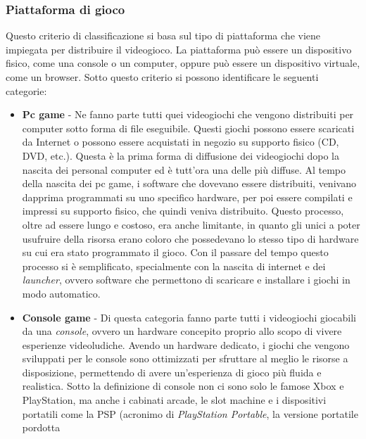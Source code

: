        \subsubsection{Piattaforma di gioco}
            Questo criterio di classificazione si basa sul tipo di piattaforma che viene impiegata per distribuire il videogioco. La piattaforma può essere un dispositivo fisico, come
            una console o un computer, oppure può essere un dispositivo virtuale, come un browser. Sotto questo criterio si possono identificare le seguenti categorie:
            \begin{itemize}
                \item \textbf{Pc game} - Ne fanno parte tutti quei videogiochi che vengono distribuiti per computer sotto forma di file eseguibile. Questi giochi possono essere
                    scaricati da Internet o possono essere acquistati in negozio su supporto fisico (CD, DVD, etc.). Questa è la prima forma di diffusione dei videogiochi dopo la
                    nascita dei personal computer ed è tutt'ora una delle più diffuse. Al tempo della nascita dei pc game, i software che dovevano essere distribuiti, venivano dapprima
                    programmati su uno specifico hardware, per poi essere compilati e impressi su supporto fisico, che quindi veniva distribuito. Questo processo, oltre ad essere
                    lungo e costoso, era anche limitante, in quanto gli unici a poter usufruire della risorsa erano coloro che possedevano lo stesso tipo di hardware su cui era
                    stato programmato il gioco. Con il passare del tempo questo processo si è semplificato, specialmente con la nascita di internet e dei \textit{launcher}, ovvero
                    software che permettono di scaricare e installare i giochi in modo automatico.
                \item \textbf{Console game} - Di questa categoria fanno parte tutti i videogiochi giocabili da una \textit{console}, ovvero un hardware concepito proprio allo scopo
                    di vivere esperienze videoludiche. Avendo un hardware dedicato, i giochi che vengono sviluppati per le console sono ottimizzati per sfruttare al meglio le risorse
                    a disposizione, permettendo di avere un'esperienza di gioco più fluida e realistica. Sotto la definizione di console non ci sono solo le famose Xbox e PlayStation,
                    ma anche i cabinati arcade, le slot machine e i dispositivi portatili come la PSP (acronimo di \textit{PlayStation Portable}, la versione portatile pordotta 

\end{itemize}
